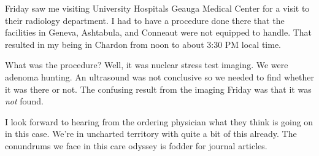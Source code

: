 Friday saw me visiting University Hospitals Geauga Medical Center for a
visit to their radiology department. I had to have a procedure done
there that the facilities in Geneva, Ashtabula, and Conneaut were not
equipped to handle. That resulted in my being in Chardon from noon to
about 3:30 PM local time.

What was the procedure? Well, it was nuclear stress test imaging. We
were adenoma hunting. An ultrasound was not conclusive so we needed to
find whether it was there or not. The confusing result from the imaging
Friday was that it was \emph{not} found.

I look forward to hearing from the ordering physician what they think is
going on in this case. We're in uncharted territory with quite a bit of
this already. The conundrums we face in this care odyssey is fodder for
journal articles.
